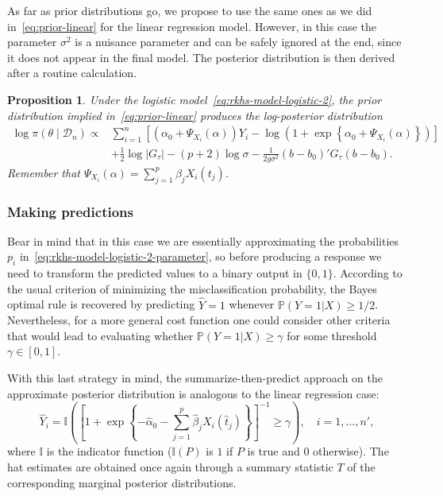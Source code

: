 \documentclass[ba]{imsart}
\numberwithin{equation}{section}
\theoremstyle{plain}
\newtheorem{proposition}{Proposition}[section]
\begin{document}
As far as prior distributions go, we propose to use the same ones as we did in~\eqref{eq:prior-linear} for the linear regression model. However, in this case the parameter \(\sigma^2\) is a nuisance parameter and can be safely ignored at the end, since it does not appear in the final model. The posterior distribution is then derived after a routine calculation.

\begin{proposition}
Under the logistic model~\eqref{eq:rkhs-model-logistic-2}, the prior distribution implied in~\eqref{eq:prior-linear} produces the log-posterior distribution
\begin{align*}
  \log \pi(\theta \mid \mathcal D_n) \propto {} & \sum_{i=1}^n \left[ \left(\alpha_0 + \Psi_{X_i}(\alpha)\right)Y_i - \log\left(1 + \exp\left\{\alpha_0 + \Psi_{X_i}(\alpha)\right\}\right)\right]\\
  \quad &+ \frac{1}{2}\log |G_\tau| - (p+2)\log \sigma -\frac{1}{2g\sigma^2} (b - b_0)'G_\tau(b - b_0).
\end{align*}
Remember that \(\Psi_{X_i}(\alpha) = \sum_{j=1}^p \beta_j X_i(t_j)\).
\end{proposition}

\subsubsection{Making predictions}

Bear in mind that in this case we are essentially approximating the probabilities \(p_i\) in~\eqref{eq:rkhs-model-logistic-2-parameter}, so before producing a response we need to transform the predicted values to a binary output in \(\{0, 1\}\). According to the usual criterion of minimizing the misclassification probability, the Bayes optimal rule is recovered by predicting \(\hat Y=1\) whenever \(\mathbb P(Y=1|X) \geq 1/2\). Nevertheless, for a more general cost function one could consider other criteria that would lead to evaluating whether \(\mathbb P(Y=1|X) \geq \gamma\) for some threshold \(\gamma\in[0, 1]\).

With this last strategy in mind, the summarize-then-predict approach on the approximate posterior distribution is analogous to the linear regression case:
\[
\hat Y_i = \mathbb I \left( \left[\displaystyle 1 + \exp\left\{-\hat\alpha_0 - \sum_{j=1}^p \hat\beta_j X_i(\hat t_j)\right\}\right]^{-1} \geq \gamma \right), \quad i=1,\dots,n',
\]
where \(\mathbb I\) is the indicator function (\(\mathbb I(P)\) is \(1\) if \(P\) is true and \(0\) otherwise). The hat estimates are obtained once again through a summary statistic \(T\) of the corresponding marginal posterior distributions.
\end{document}
